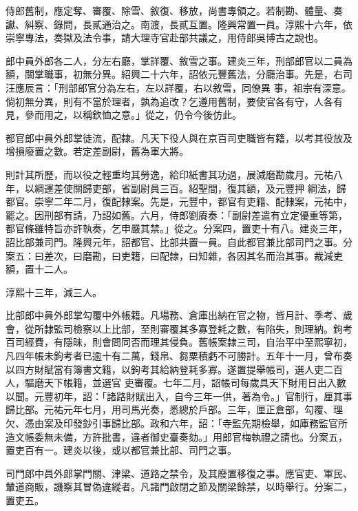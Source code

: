 \begin{pinyinscope}
 侍郎舊制，應定奪、審覆、除雪、敘復、移放，尚書專領之。若制勘、體量、奏讞、糾察、錄問，長貳通治之。南渡，長貳互置。隆興常置一員。淳熙十六年，依崇寧專法，奏獄及法令事，請大理寺官赴部共議之，用侍郎吳博古之說也。



 郎中員外郎各二人，分左右廳，掌詳覆、敘雪之事。建炎三年，刑部郎官以二員為額，關掌職事，初無分異。紹興二十六年，詔依元豐舊法，分廳治事。先是，右司汪應辰言：「刑部郎官分為左右，左以詳覆，右以敘雪，同僚異
 事，祖宗有深意。倘初無分異，則有不當於理者，孰為追改？乞遵用舊制，要使官各有守，人各有見，參而用之，以稱欽恤之意。」從之，仍令今後仿此。



 都官郎中員外郎掌徒流，配隸。凡天下役人與在京百司吏職皆有籍，以考其役放及增損廢置之數。若定差副尉，舊為軍大將。



 則計其所歷，而以役之輕重均其勞逸，給印紙書其功過，展減磨勘歲月。元祐八年，以綱運差使關歸吏部，省副尉員三百。紹聖間，復其額，及元豐押
 綱法，歸都官。崇寧二年二月，復配隸案。先是，元豐中，都官有吏籍、配隸案，元祐中，罷之。因刑部有請，乃詔如舊。六月，侍郎劉賡奏：「副尉差遣有立定優重等第，都官條雖特旨亦許執奏，乞申嚴其禁。」從之。分案四，置吏十有八。建炎三年，詔比部兼司門。隆興元年，詔都官、比部共置一員。自此都官兼比部司門之事。分案五：曰差次，曰磨勘，曰吏籍，曰配隸，曰知雜，各因其名而治其事。裁減吏額，置十二人。



 淳熙十三年，減三人。



 比部郎中員外郎掌勾覆中外帳籍。凡場務、倉庫出納在官之物，皆月計、季考、歲會，從所隸監司檢察以上比部，至則審覆其多寡登耗之數，有陷失，則理納。鉤考百司經費，有隱昧，則會問同否而理其侵負。舊帳案隸三司，自治平中至熙寧初，凡四年帳未鉤考者已逾十有二萬，錢帛、芻粟積虧不可勝計。五年十一月，曾布奏以四方財賦當有簿書文籍，以鉤考其給納登耗多寡。遂置提舉帳司，選人吏二百人，驅磨天下帳籍，並選官
 吏審覆。七年二月，詔帳司每歲具天下財用日出入數以聞。元豐初年，詔：「諸路財賦出入，自今三年一供，著為令。」官制行，厘其事歸比部。元祐元年七月，用司馬光奏，悉總於戶部。三年，厘正倉部，勾覆、理欠、憑由案及印發鈔引事歸比部。政和六年，詔：「寺監先期檢舉，如庫務監官所造文帳委無未備，方許批書，違者御史臺奏劾。」用郎官梅執禮之請也。分案五，置吏百有一。建炎以後，或以都官兼比部、司門之事。



 司門郎中員外郎掌門關、津梁、道路之禁令，及其廢置移復之事。應官吏、軍民、輦道商販，譏察其冒偽違縱者。凡諸門啟閉之節及關梁餘禁，以時舉行。分案二，置吏五。




\end{pinyinscope}
